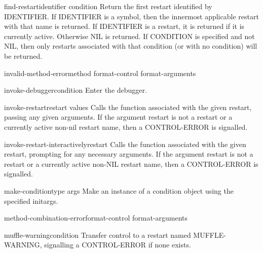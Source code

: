 \begin{function}{find-restart}{identifier \op condition}
  Return the first restart identified by IDENTIFIER. If IDENTIFIER is a symbol,
then the innermost applicable restart with that name is returned. If IDENTIFIER
is a restart, it is returned if it is currently active. Otherwise NIL is
returned. If CONDITION is specified and not NIL, then only restarts associated
with that condition (or with no condition) will be returned.
\end{function}

\begin{function}{invalid-method-error}{method format-control \rest format-arguments}
  
\end{function}

\begin{function}{invoke-debugger}{condition}
  Enter the debugger.
\end{function}

\begin{function}{invoke-restart}{restart \rest values}
  Calls the function associated with the given restart, passing any given
   arguments. If the argument restart is not a restart or a currently active
   non-nil restart name, then a CONTROL-ERROR is signalled.
\end{function}

\begin{function}{invoke-restart-interactively}{restart}
  Calls the function associated with the given restart, prompting for any
   necessary arguments. If the argument restart is not a restart or a
   currently active non-NIL restart name, then a CONTROL-ERROR is signalled.
\end{function}

\begin{function}{make-condition}{type \rest args}
  Make an instance of a condition object using the specified initargs.
\end{function}

\begin{function}{method-combination-error}{format-control \rest format-arguments}
  
\end{function}

\begin{function}{muffle-warning}{\op condition}
  Transfer control to a restart named MUFFLE-WARNING, signalling a
   CONTROL-ERROR if none exists.
\end{function}

